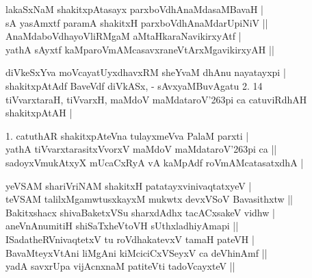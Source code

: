 \begin{entry}
\smallskip
\begin{shl}
lakaSxNaM shakitxpAtasayx parxboVdhAnaMdasaMBavaH |\\
sA yasAmxtf paramA shakitxH parxboVdhAnaMdarUpiNiV ||\\
AnaMdaboVdhayoVliRMgaM aMtaHkaraNavikirxyAtf |\\
yathA sAyxtf kaMparoVmAMcasavxraneVtArxMgavikirxyAH ||
\end{shl}
\smallskip
{}
\smallskip
{}
\smallskip
{}
\end{entry}

\begin{entry}
\medskip

\begin{shl}
diVkeSxYva moVcayatUyxdhavxRM sheYvaM dhAnu nayatayxpi |\\
shakitxpAtAdf BaveVdf diVkASx, - sAvxyaMBuvAgatu 2. 14\\
tiVvarxtaraH, tiVvarxH, maMdoV maMdataroV\char'263pi ca catuviRdhAH shakitxpAtAH |
\end{shl}
\smallskip
\begin{shl}
1. catuthAR shakitxpAteVna tulayxmeVva PalaM parxti |\\
yathA tiVvarxtarasitxVvorxV maMdoV maMdataroV\char'263pi ca ||\\
sadoyxVmukAtxyX mUcaCxRyA vA kaMpAdf roVmAMcatasatxdhA |
\end{shl}
\smallskip
{}
\end{entry}

\begin{entry}
\medskip

\begin{shl}
yeVSAM shariVriNAM shakitxH patatayxvinivaqtatxyeV |\\
teVSAM talilxMgamwtusxkayxM mukwtx devxVSoV Bavasithxtw ||\\
Bakitxshacx shivaBaketxVSu sharxdAdhx tacACxsakeV vidhw |\\
aneVnAnumitiH shiSaTxheVtoVH sUthxladhiyAmapi ||\\
ISadatheRVnivaqtetxV tu roVdhakatevxV tamaH pateVH |\\
BavaMteyxVtAni liMgAni kiMciciCxVSeyxV ca deVhinAmf ||\\
yadA savxrUpa vijAcnxnaM patiteVti tadoVcayxteV ||
\end{shl}
\medskip
{}
\end{entry}

